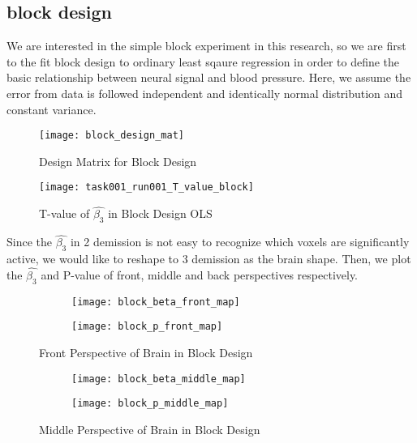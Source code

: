 \subsection{block design}

We are interested in the simple block experiment in this research, so we are 
first to the fit block design to ordinary least sqaure regression in order to
define the basic relationship between neural signal and blood pressure. Here, 
we assume the error from data is followed independent and identically normal
distribution and constant variance.

\begin{figure}[ht]
\centering
\texttt{[image: block\_design\_mat]}
\caption{Design Matrix for Block Design}
\end{figure}

\begin{figure}[ht]
\centering
\texttt{[image: task001\_run001\_T\_value\_block]}
\caption{T-value of $\hat{\beta_{3}}$ in Block Design OLS}
\end{figure}


Since the $\hat{\beta_{3}}$ in 2 demission is not easy to recognize which voxels
are significantly active, we would like to reshape to 3 demission as the brain 
shape. Then, we plot the $\hat{\beta_{3}}$ and P-value of front, middle and 
back perspectives respectively.

\begin{figure}[ht]
\centering
\begin{subfigure}{.45\textwidth}
  \texttt{[image: block\_beta\_front\_map]}
\end{subfigure}%
\begin{subfigure}{.5\textwidth}
  \texttt{[image: block\_p\_front\_map]}
  \centering
\end{subfigure}
\caption{Front Perspective of Brain in Block Design\label{fig:fpBrain}}
\end{figure}

\begin{figure}[ht]
\centering
\begin{subfigure}{.45\textwidth}
  \texttt{[image: block\_beta\_middle\_map]}
\end{subfigure}%
\begin{subfigure}{.5\textwidth}
  \texttt{[image: block\_p\_middle\_map]}
  \centering
\end{subfigure}
\caption{Middle Perspective of Brain in Block Design\label{fig:mpBrain}}
\end{figure}

